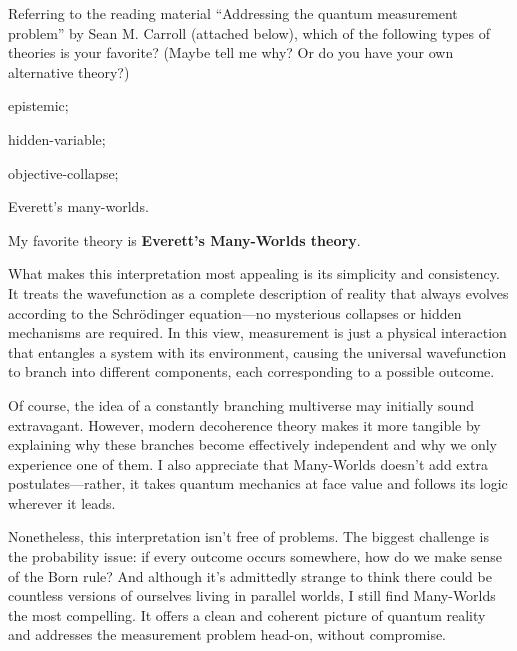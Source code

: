 \begin{problem}
  Referring to the reading material ``Addressing the quantum measurement problem''
  by Sean M. Carroll (attached below),
  which of the following types of theories is your favorite?
  (Maybe tell me why? Or do you have your own alternative theory?)
  \begin{enumerate*}
    \item epistemic;
    \item hidden-variable;
    \item objective-collapse;
    \item Everett's many-worlds.
  \end{enumerate*}
\end{problem}
\begin{solution}
  My favorite theory is \textbf{Everett's Many-Worlds theory}.

  What makes this interpretation most appealing is its simplicity and consistency. It treats the wavefunction as a complete description of reality that always evolves according to the Schr\"odinger equation—no mysterious collapses or hidden mechanisms are required. In this view, measurement is just a physical interaction that entangles a system with its environment, causing the universal wavefunction to branch into different components, each corresponding to a possible outcome.

  Of course, the idea of a constantly branching multiverse may initially sound extravagant. However, modern decoherence theory makes it more tangible by explaining why these branches become effectively independent and why we only experience one of them. I also appreciate that Many-Worlds doesn't add extra postulates—rather, it takes quantum mechanics at face value and follows its logic wherever it leads.

  Nonetheless, this interpretation isn't free of problems. The biggest challenge is the probability issue: if every outcome occurs somewhere, how do we make sense of the Born rule? And although it's admittedly strange to think there could be countless versions of ourselves living in parallel worlds, I still find Many-Worlds the most compelling. It offers a clean and coherent picture of quantum reality and addresses the measurement problem head-on, without compromise.
\end{solution}

\clearpage

